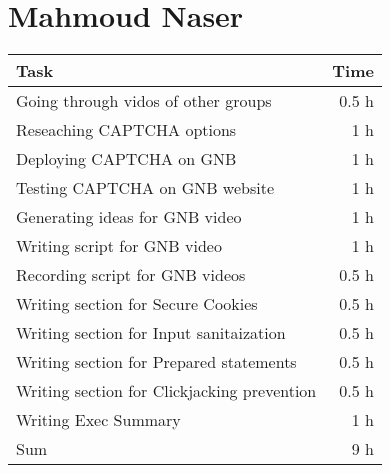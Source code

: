 \clearpage
\section*{Mahmoud Naser}
\begin{table}[h!tpb]
  \centering
  \begin{tabularx}{\textwidth}{X r}
    \toprule
      Task & Time \\
    \midrule
      Going through vidos of other groups & 0.5 h \\
      Reseaching CAPTCHA options & 1 h \\
      Deploying CAPTCHA on GNB & 1 h \\
      Testing CAPTCHA on GNB website & 1 h \\
      Generating ideas for GNB video & 1 h \\
      Writing script for GNB video & 1 h \\
      Recording script for GNB videos & 0.5 h\\ 
      Writing section for Secure Cookies & 0.5 h\\
      Writing section for Input sanitaization & 0.5 h\\
      Writing section for Prepared statements & 0.5 h\\
      Writing section for Clickjacking prevention & 0.5 h\\
      Writing Exec Summary & 1 h\\
    \midrule
      Sum & 9 h \\
    \bottomrule
  \end{tabularx}
\end{table}
